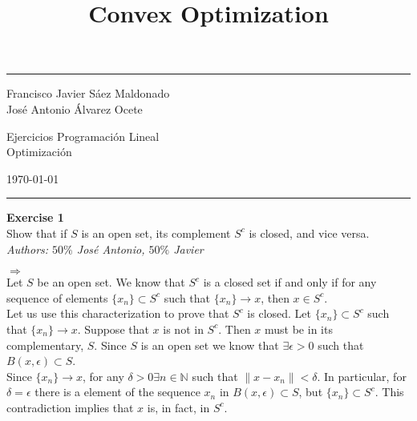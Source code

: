 \documentclass[11pt,table]{article}
\title{Convex Optimization}
\newenvironment{problem}[2][Exercise]
{ \begin{mdframed}[backgroundcolor=gray!20] \textbf{#1 #2} \\}
	{\hspace{0.0cm}\newline\newline \emph{Authors: \(50\%\) José Antonio, \(50\%\) Javier}  \end{mdframed}}
\begin{document}
	
	
	\fancyhead[C]{}
	\hrule \medskip %
	\begin{minipage}{0.295\textwidth}
		\raggedright
		\footnotesize
		Francisco Javier Sáez Maldonado \hfill\\
		José Antonio Álvarez Ocete \hfill\\
	\end{minipage}
	\begin{minipage}{0.4\textwidth}
		\centering
		\large
		Ejercicios Programación Lineal\\
		\normalsize
		Optimización\\
	\end{minipage}
	\begin{minipage}{0.295\textwidth}
		\raggedleft
		\today\hfill\\
	\end{minipage}
	\medskip\hrule
	\bigskip
	
	
	\begin{problem}{1}
		Show that if \( S \) is an open set, its complement \( S^c \) is closed, and vice versa.
	\end{problem}
	
	\(\boxed{\Rightarrow}\)\\
	
	Let \(S\) be an open set. We know that \(S^c\) is a closed set if and only if for any sequence of elements \(\{x_n\} \subset S^c\) such that \(\{x_n\} \longrightarrow x\), then \(x \in S^c\). \\
	
	Let us use this characterization to prove that \(S^c\) is closed. Let \(\{x_n\} \subset S^c\) such that \(\{x_n\} \longrightarrow x\). Suppose that \(x\) is not in \(S^c\). Then \(x\) must be in its complementary, \(S\). Since \(S\) is an open set we know that \(\exists \epsilon > 0\) such that \( B(x, \epsilon) \subset S\). \\
	
	Since \(\{x_n\} \longrightarrow x\), for any \(\delta > 0 \exists n \in \mathbb{N}\) such that \( \parallel x - x_n \parallel < \delta\). In particular, for \(\delta = \epsilon\) there is a element of the sequence \(x_n\) in \( B(x, \epsilon) \subset S\), but \(\{x_n\} \subset S^c\). This contradiction implies that \(x\) is, in fact, in \(S^c\).
	
\end{document}
